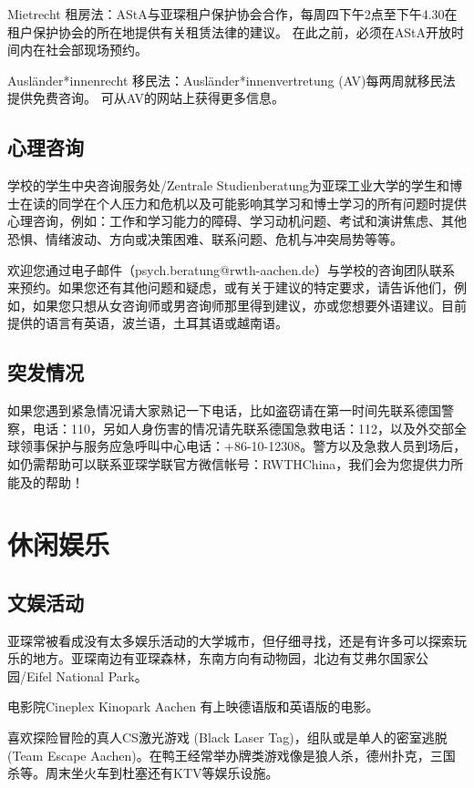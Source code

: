     Mietrecht 租房法：AStA与亚琛租户保护协会合作，每周四下午2点至下午4.30在租户保护协会的所在地提供有关租赁法律的建议。 在此之前，必须在AStA开放时间内在社会部现场预约。

    Ausländer*innenrecht 移民法：Ausländer*innenvertretung (AV)每两周就移民法提供免费咨询。 可从AV的网站上获得更多信息。

  \subsection{心理咨询}

    学校的学生中央咨询服务处/Zentrale Studienberatung为亚琛工业大学的学生和博士在读的同学在个人压力和危机以及可能影响其学习和博士学习的所有问题时提供心理咨询，例如：工作和学习能力的障碍、学习动机问题、考试和演讲焦虑、其他恐惧、情绪波动、方向或决策困难、联系问题、危机与冲突局势等等。

    欢迎您通过电子邮件（psych.beratung@rwth-aachen.de）与学校的咨询团队联系来预约。如果您还有其他问题和疑虑，或有关于建议的特定要求，请告诉他们，例如，如果您只想从女咨询师或男咨询师那里得到建议，亦或您想要外语建议。目前提供的语言有英语，波兰语，土耳其语或越南语。

  \subsection{突发情况}

    如果您遇到紧急情况请大家熟记一下电话，比如盗窃请在第一时间先联系德国警察，电话：110，另如人身伤害的情况请先联系德国急救电话：112，以及外交部全球领事保护与服务应急呼叫中心电话：+86-10-12308。警方以及急救人员到场后，如仍需帮助可以联系亚琛学联官方微信帐号：RWTHChina，我们会为您提供力所能及的帮助！

\section{休闲娱乐}

  \subsection{文娱活动}

    亚琛常被看成没有太多娱乐活动的大学城市，但仔细寻找，还是有许多可以探索玩乐的地方。亚琛南边有亚琛森林，东南方向有动物园，北边有艾弗尔国家公园/Eifel National Park。

    电影院Cineplex Kinopark Aachen 有上映德语版和英语版的电影。

    喜欢探险冒险的真人CS激光游戏 (Black Laser Tag)，组队或是单人的密室逃脱 (Team Escape Aachen)。在鸭王经常举办牌类游戏像是狼人杀，德州扑克，三国杀等。周末坐火车到杜塞还有KTV等娱乐设施。

